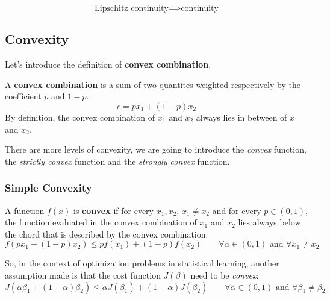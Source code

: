 \begin{theorem}
    \[
        \text{Lipschitz continuity} \implies \text{continuity}
    \]
\end{theorem}
\subsection{Convexity}
Let's introduce the definition of \textbf{convex combination}.
\begin{definition}
    A \textbf{convex combination} is a sum of two quantites weighted respectively by the coefficient $p$ and $1-p$.
    \[
        c = p x_1 + (1-p) x_2
    \]
    By definition, the convex combination of $x_1$ and $x_2$ always lies in between of $x_1$ and $x_2$.
\end{definition}

There are more levels of convexity, we are going to introduce the \textit{convex} function, the \textit{strictly convex} function and the \textit{strongly convex} function.
\subsubsection*{Simple Convexity}

\begin{definition}
    A function $f(x)$ is \textbf{convex} if for every $x_1, x_2$, $x_1 \neq x_2$ and for every $p \in (0,1)$, the function evaluated in the convex combination of $x_1$ and $x_2$ lies always below the chord that is described by the convex combination.
    \[
        f(p x_1 + (1-p) x_2) \leq p f(x_1) + (1-p) f(x_2) \qquad \forall \alpha \in (0,1) \text{ and } \forall x_1 \neq x_2
    \]
\end{definition}

So, in the context of optimization problems in statistical learning, another assumption made is that the cost function $J(\beta)$ need to be \textit{convex}:
\[
    J(\alpha \beta_1 + (1-\alpha)\beta_2) \leq \alpha J(\beta_1) + (1-\alpha)J(\beta_2) \qquad  \forall \alpha \in (0,1) \text{ and } \forall \beta_1 \neq \beta_2
\]

